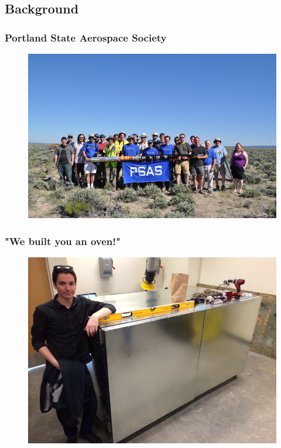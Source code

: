 \documentclass{beamer}
\begin{document}
\subsection{Background}
\begin{frame}
\frametitle{Portland State Aerospace Society}
\begin{figure}
\includegraphics[width=0.8\linewidth]{psas.jpg}
\end{figure}
\end{frame}
\begin{frame}
\frametitle{"We built you an oven!"}
\begin{figure}
\includegraphics[width=0.8\linewidth]{curing-oven.png}
\end{figure}
\end{frame}
\end{document}
